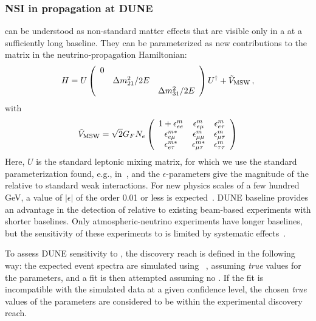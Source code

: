 \subsubsection{NSI in propagation at DUNE}
  can be understood as non-standard
matter effects that are visible only in a  at a sufficiently long baseline. They can be parameterized as new contributions
to the  matrix in the neutrino-propagation Hamiltonian:
\begin{equation}
  H = U \left( \begin{array}{ccc}
           0 &                    & \\
             & \Delta m_{21}^2/2E & \\
             &                    & \Delta m_{31}^2/2E
         \end{array} \right) U^\dag + \tilde{V}_{\rm MSW} \,,
\end{equation}
with
\begin{equation}
  \tilde{V}_{\rm MSW} = \sqrt{2} G_F N_e
\left(
  \begin{array}{ccc}
    1 + \epsilon^m_{ee}       & \epsilon^m_{e\mu}       & \epsilon^m_{e\tau}  \\
        \epsilon^{m*}_{e\mu}  & \epsilon^m_{\mu\mu}     & \epsilon^m_{\mu\tau} \\
        \epsilon^{m*}_{e\tau} & \epsilon^{m*}_{\mu\tau} & \epsilon^m_{\tau\tau}
  \end{array} 
\right)
\label{eq:epsmatrix}
\end{equation}
Here, $U$ is the standard  leptonic mixing matrix, for which we use the standard parameterization found, e.g., in~\cite{Tanabashi:2018oca}, %
and the $\epsilon$-parameters give the
magnitude of the  relative to standard weak interactions.  For new physics
scales of a few hundred GeV,  a value of $|\epsilon|$ of the order
0.01 or less is
expected~\cite{Davidson:2003ha,GonzalezGarcia:2007ib,Biggio:2009nt}. DUNE
baseline provides an advantage in the detection of   relative
to existing beam-based experiments with shorter baselines.
Only atmospheric-neutrino experiments have longer baselines, but the sensitivity
of these experiments to   is limited by systematic effects~\cite{Adams:2013qkq}.

To assess DUNE sensitivity to   , the   discovery reach
is defined in the following way: the expected event spectra are
simulated using  ~\cite{Huber:2004ka,Huber:2007ji}, assuming \textit{true} values for the   
parameters, and a fit is then attempted assuming no  . If the fit is
incompatible with the simulated data at a given confidence level,
the chosen \emph{true} values of the   parameters are considered to be within the experimental discovery reach.


